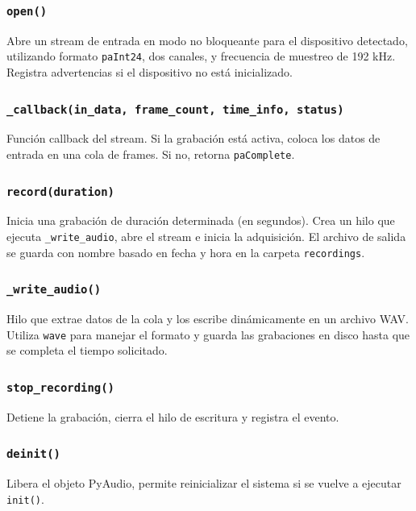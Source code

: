 \subsubsection*{\texttt{open()}}

Abre un stream de entrada en modo no bloqueante para el dispositivo detectado, utilizando formato \texttt{paInt24}, dos canales, y frecuencia de muestreo de 192 kHz. Registra advertencias si el dispositivo no está inicializado.

\subsubsection*{\texttt{\_callback(in\_data, frame\_count, time\_info, status)}}

Función callback del stream. Si la grabación está activa, coloca los datos de entrada en una cola de frames. Si no, retorna \texttt{paComplete}.

\subsubsection*{\texttt{record(duration)}}

Inicia una grabación de duración determinada (en segundos). Crea un hilo que ejecuta \texttt{\_write\_audio}, abre el stream e inicia la adquisición. El archivo de salida se guarda con nombre basado en fecha y hora en la carpeta \texttt{recordings}.

\subsubsection*{\texttt{\_write\_audio()}}

Hilo que extrae datos de la cola y los escribe dinámicamente en un archivo WAV. Utiliza \texttt{wave} para manejar el formato y guarda las grabaciones en disco hasta que se completa el tiempo solicitado.

\subsubsection*{\texttt{stop\_recording()}}

Detiene la grabación, cierra el hilo de escritura y registra el evento.

\subsubsection*{\texttt{deinit()}}

Libera el objeto PyAudio, permite reinicializar el sistema si se vuelve a ejecutar \texttt{init()}.

